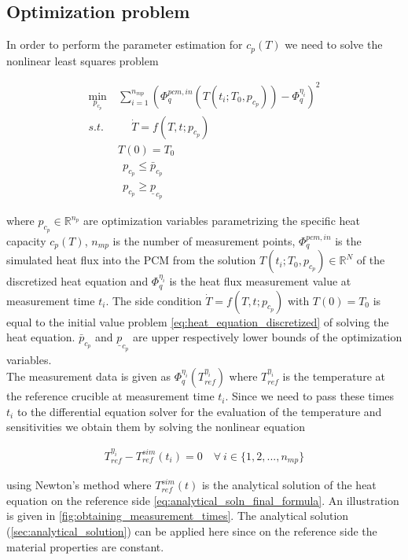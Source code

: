 \documentclass{scrartcl}[12pt, halfparskip]
\numberwithin{equation}{section}
\numberwithin{figure}{section}
\numberwithin{table}{section}
\begin{document}
\newpage
\subsection{Optimization problem}
\label{sec:optimization_problem}
In order to perform the parameter estimation for $c_p(T)$ we need to solve the nonlinear least squares problem

\begin{align}
	\min_{p_{c_p}} \ & \sum_{i=1}^{n_{mp}} \left(  \varPhi_{q}^{pcm,in}(T(t_i;T_0,p_{c_p})) - \varPhi_q^{\eta_i} \right)^2 \label{eq:parameter_estimation_least_squares_problem} \\
	s.t. \ & \quad \  \dot{T} = f(T,t;p_{c_p}) \nonumber \\
	& T(0) = T_0 \nonumber \\
	& \ \ p_{c_p} \le \bar{p}_{c_p} \nonumber \\
	& \ \ p_{c_p} \ge \underline{p}_{c_p} \nonumber
\end{align}

where $p_{c_p} \in \mathbb{R}^{n_p}$ are optimization variables parametrizing the specific heat capacity $c_p(T)$, $n_{{mp}}$ is the number of measurement points, $\varPhi_{q}^{pcm,in}$ is the simulated heat flux into the PCM from the solution $T(t_i;T_0,p_{c_p}) \in \mathbb{R}^N$ of the discretized heat equation and $\varPhi_q^{\eta_i}$ is the heat flux measurement value at measurement time $t_i$. The side condition $\dot{T} = f(T,t;p_{c_p})$ with $T(0) = T_0$ is equal to the initial value problem \cref{eq:heat_equation_discretized} of solving the heat equation. $\bar{p}_{c_p}$ and $\underline{p}_{c_p}$ are upper respectively lower bounds of the optimization variables. \\

The measurement data is given as $\varPhi_q^{\eta_i}(T_{ref}^{\eta_i})$ where $T_{ref}^{\eta_i}$ is the temperature at the reference crucible at measurement time $t_i$. Since we need to pass these times $t_i$ to the differential equation solver for the evaluation of the temperature and sensitivities we obtain them by solving the nonlinear equation 

\begin{align}
	T_{ref}^{\eta_i} - T_{ref}^{sim}(t_i) = 0 \quad \forall \ i \in \{1,2,...,n_{mp}\}
\end{align}

using Newton's method where $T_{ref}^{sim}(t)$ is the analytical solution of the heat equation on the reference side \cref{eq:analytical_soln_final_formula}. An illustration is given in \cref{fig:obtaining_measurement_times}. The analytical solution (\cref{sec:analytical_solution}) can be applied here since on the reference side the material properties are constant.
\end{document}
